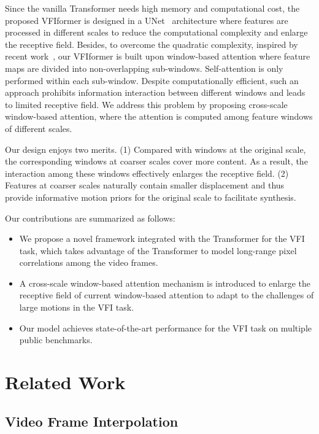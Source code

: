 \documentclass[10pt,twocolumn,letterpaper]{article}
\begin{document}
	
	Since the vanilla Transformer needs high memory and computational cost, the proposed VFIformer is designed in a UNet~\cite{unet} architecture where features are processed in different scales to reduce the computational complexity and enlarge the receptive field. Besides, to overcome the quadratic complexity, inspired by recent work~\cite{liu2021swin,wang2021uformer,liang2021swinir,chu2021twins}, our VFIformer is built upon window-based attention where feature maps are divided into non-overlapping sub-windows. Self-attention is only performed within each sub-window. Despite computationally efficient, such an approach prohibits information interaction between different windows and leads to limited receptive field. We address this problem by proposing cross-scale window-based attention, where the attention is computed among feature windows of different scales. 
	
	Our design enjoys two merits. (1) Compared with windows at the original scale, the corresponding windows at coarser scales cover more content. As a result, the interaction among these windows effectively enlarges the receptive field. (2) Features at coarser scales naturally contain smaller displacement and thus provide informative motion priors for the original scale to facilitate synthesis. 
	
	
	Our contributions are summarized as follows:
	\begin{itemize}
		\item We propose a novel framework integrated with the Transformer for the VFI task, which takes advantage of the Transformer to model long-range pixel correlations among the video frames.
		\item A cross-scale window-based attention mechanism is introduced to enlarge the receptive field of current window-based attention to adapt to the challenges of large motions in the VFI task.
		\item Our model achieves state-of-the-art performance for the VFI task on multiple public benchmarks.
	\end{itemize}
	
	
	


\section{Related Work}
	
	\subsection{Video Frame Interpolation}
	
\end{document}
